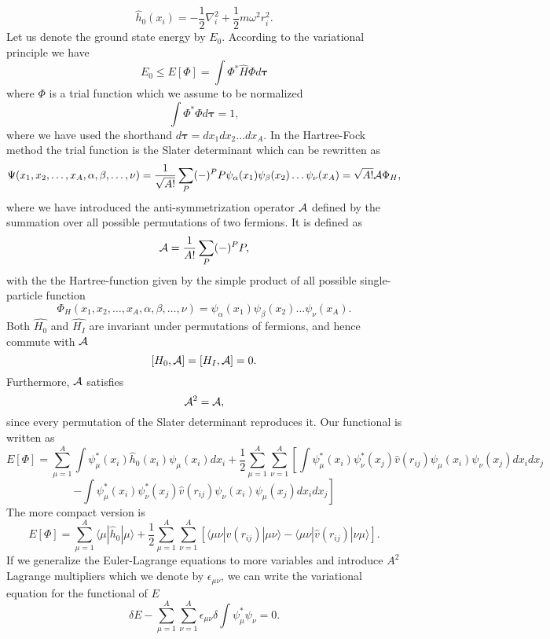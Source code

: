 \[
  \hat{h}_0(x_i) = - \frac{1}{2} \nabla^2_i
  +\frac{1}{2}m\omega^2r_i^2.
\]
Let us denote the ground state energy by $E_0$. According to the
variational principle we have
\begin{equation*}
  E_0 \le E[\Phi] = \int \Phi^*\hat{H}\Phi d\mathbf{\tau}
\end{equation*}
where $\Phi$ is a trial function which we assume to be normalized
\begin{equation*}
  \int \Phi^*\Phi d\mathbf{\tau} = 1,
\end{equation*}
where we have used the shorthand $d\mathbf{\tau}=dx_1dx_2\dots dx_A$.
In the Hartree-Fock method the trial function is the Slater
determinant which can be rewritten as
\[
  \Psi(x_1,x_2,\dots,x_A,\alpha,\beta,\dots,\nu) =
  \frac{1}{\sqrt{A!}}\sum_{P} (-)^PP\psi_{\alpha}(x_1)
  \psi_{\beta}(x_2)\dots\psi_{\nu}(x_A)=\sqrt{A!}{\cal A}\Phi_H,
\]
where we have introduced the anti-symmetrization operator ${\cal A}$
defined by the summation over all possible permutations of two
fermions.  It is defined as
\[
  {\cal A} = \frac{1}{A!}\sum_{P} (-)^PP,
\]
with the the Hartree-function given by the simple product of all
possible single-particle function
\[
  \Phi_H(x_1,x_2,\dots,x_A,\alpha,\beta,\dots,\nu) =
  \psi_{\alpha}(x_1) \psi_{\beta}(x_2)\dots\psi_{\nu}(x_A).
\]
Both $\hat{H_0}$ and $\hat{H_I}$ are invariant under permutations of
fermions, and hence commute with ${\cal A}$
\[
  [H_0,{\cal A}] = [H_I,{\cal A}] = 0.
\]
Furthermore, ${\cal A}$ satisfies
\[
  {\cal A}^2 = {\cal A},
\]
since every permutation of the Slater determinant reproduces it.  Our
functional is written as
\[
  E[\Phi] = \sum_{\mu=1}^A \int
  \psi_{\mu}^*(x_i)\hat{h}_0(x_i)\psi_{\mu}(x_i) dx_i +
  \frac{1}{2}\sum_{\mu=1}^A\sum_{\nu=1}^A \left[ \int
    \psi_{\mu}^*(x_i)\psi_{\nu}^*(x_j)\hat{v}(r_{ij})\psi_{\mu}(x_i)\psi_{\nu}(x_j)
    dx_idx_j \right.
\]
\[ \left.
  - \int
  \psi_{\mu}^*(x_i)\psi_{\nu}^*(x_j)\hat{v}(r_{ij})\psi_{\nu}(x_i)\psi_{\mu}(x_j)
  dx_idx_j\right]
\]
The more compact version is
\[
  E[\Phi] = \sum_{\mu=1}^A \langle \mu | \hat{h}_0 | \mu\rangle+
  \frac{1}{2}\sum_{\mu=1}^A\sum_{\nu=1}^A\left[\langle \mu\nu
    |\hat{v}(r_{ij})|\mu\nu\rangle-\langle \mu\nu
    |\hat{v}(r_{ij})|\nu\mu\rangle\right].
\]
If we generalize the Euler-Lagrange equations to more variables and
introduce $A^2$ Lagrange multipliers which we denote by
$\epsilon_{\mu\nu}$, we can write the variational equation for the
functional of $E$
\[
  \delta E - \sum_{{\mu}=1}^A\sum_{{\nu}=1}^A \epsilon_{\mu\nu} \delta
  \int \psi_{\mu}^* \psi_{\nu} = 0.
\]
